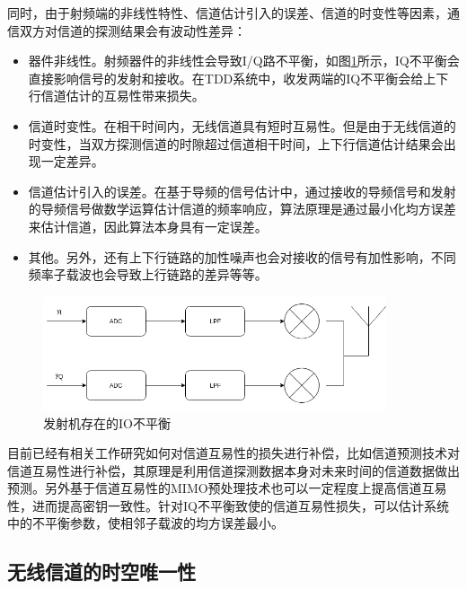 \documentclass[master]{seuthesis} %
\begin{document}
\begin{Main}
同时，由于射频端的非线性特性、信道估计引入的误差、信道的时变性等因素\cite{guillaud2005practical}，通信双方对信道的探测结果会有波动性差异：

\begin{itemize}
    \item 器件非线性。射频器件的非线性会导致I/Q路不平衡，如图\ref{iq_imbalance}所示，IQ不平衡会直接影响信号的发射和接收。在TDD系统中，收发两端的IQ不平衡会给上下行信道估计的互易性带来损失。
    \item 信道时变性。在相干时间内，无线信道具有短时互易性。但是由于无线信道的时变性，当双方探测信道的时隙超过信道相干时间，上下行信道估计结果会出现一定差异。
    \item 信道估计引入的误差。在基于导频的信号估计中，通过接收的导频信号和发射的导频信号做数学运算估计信道的频率响应，算法原理是通过最小化均方误差来估计信道，因此算法本身具有一定误差。
    \item 其他。另外，还有上下行链路的加性噪声也会对接收的信号有加性影响，不同频率子载波也会导致上行链路的差异等等。
\end{itemize}

\begin{figure}[htbp!]
    \centering \includegraphics[width=0.9\textwidth]{images/iq_imbalance} 
    \caption{发射机存在的IO不平衡}
    \label{iq_imbalance}
\end{figure}


目前已经有相关工作研究如何对信道互易性的损失进行补偿，比如信道预测技术对信道互易性进行补偿，其原理是利用信道探测数据本身对未来时间的信道数据做出预测\cite{heidari2010adaptive}。另外基于信道互易性的MIMO预处理技术也可以一定程度上提高信道互易性，进而提高密钥一致性。针对IQ不平衡致使的信道互易性损失，可以估计系统中的不平衡参数，使相邻子载波的均方误差最小\cite{tubbax2005compensation}。

\subsection{无线信道的时空唯一性}


\end{Main}
\end{document}
